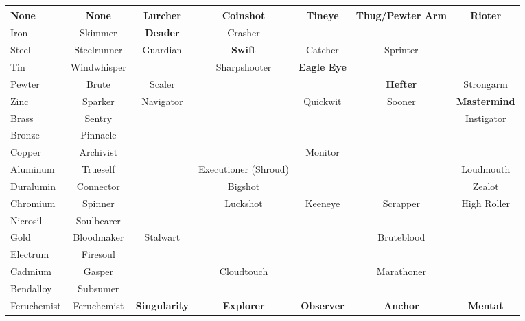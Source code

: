 \documentclass[conference]{IEEEtran}
\begin{document}
\begin{table}[h]
\begin{center}
\begin{tabular}{|l |c |c |c |c |c |c | }
		\hline
		None&None&\cellcolor{darkgreen}Lurcher&\cellcolor{darkgreen}Coinshot&\cellcolor{darkgreen}Tineye&\cellcolor{darkgreen}Thug/Pewter Arm&\cellcolor{darkgreen}Rioter\\\hline
		Iron&\cellcolor{darkgreen}Skimmer&\cellcolor{lightgreen}\textbf{Deader}&\cellcolor{darkgreen}Crasher& & & \\\hline
		Steel&\cellcolor{darkgreen}Steelrunner&\cellcolor{lightgreen}Guardian&\cellcolor{lightgreen}\textbf{Swift}&\cellcolor{lightgreen}Catcher& \cellcolor{lightgreen}Sprinter& \\\hline
		Tin&\cellcolor{darkgreen}Windwhisper& &\cellcolor{lightgreen}Sharpshooter&\cellcolor{lightgreen}\textbf{Eagle Eye}& & \\\hline
		Pewter&\cellcolor{darkgreen}Brute&\cellcolor{lightgreen} Scaler& & &\cellcolor{lightgreen}\textbf{Hefter}&\cellcolor{lightgreen} Strongarm \\\hline
		Zinc&\cellcolor{darkgreen}Sparker&\cellcolor{lightgreen}Navigator& &\cellcolor{lightgreen}Quickwit&\cellcolor{lightgreen}Sooner& \cellcolor{lightgreen}\textbf{Mastermind} \\\hline
		Brass&\cellcolor{orange}Sentry& & & & & \cellcolor{lightorange}Instigator  \\\hline
		Bronze&\cellcolor{darkgreen}Pinnacle& & & & & 
		\\\hline
		Copper&\cellcolor{darkgreen}Archivist& & &  \cellcolor{lightgreen}Monitor
		& &\\\hline
		Aluminum&\cellcolor{darkgreen}Trueself& &\cellcolor{red} Executioner (Shroud) & &  &\cellcolor{lightgreen}Loudmouth\\\hline
		Duralumin&\cellcolor{darkgreen}Connector& &\cellcolor{lightgreen}Bigshot& & &\cellcolor{lightgreen}Zealot \\\hline
		Chromium& \cellcolor{darkgreen}Spinner &&\cellcolor{lightgreen}Luckshot&\cellcolor{lightgreen}Keeneye&\cellcolor{lightgreen}Scrapper&\cellcolor{lightgreen}High Roller\\\hline
		Nicrosil&\cellcolor{darkgreen}Soulbearer&&&&& \\\hline
		Gold&\cellcolor{darkgreen}Bloodmaker&\cellcolor{lightgreen}Stalwart&&&\cellcolor{lightgreen}Bruteblood& \\\hline
		Electrum&\cellcolor{orange}Firesoul& & & & &  \\\hline
		Cadmium&\cellcolor{darkgreen}Gasper&&\cellcolor{lightgreen}Cloudtouch&&\cellcolor{lightgreen}Marathoner& \\\hline
		Bendalloy&\cellcolor{darkgreen}Subsumer&&&&& \\\hline
		Feruchemist&\cellcolor{darkgreen}Feruchemist&\cellcolor{lightblue} \textbf{Singularity}&\cellcolor{lightblue} \textbf{Explorer}&\cellcolor{lightblue} \textbf{Observer}&\cellcolor{lightblue} \textbf{Anchor}&\cellcolor{lightblue} \textbf{Mentat}\\\hline
		\hline
		

\end{tabular}
\end{center}
\end{table}
\end{document}
